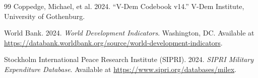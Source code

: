 \documentclass[11pt]{article}
\begin{document}
\begin{thebibliography}{99}
Coppedge, Michael, et al. 2024.
``V-Dem Codebook v14.''
V-Dem Institute, University of Gothenburg.

World Bank. 2024.
\textit{World Development Indicators}.
Washington, DC.
Available at \url{https://databank.worldbank.org/source/world-development-indicators}.

Stockholm International Peace Research Institute (SIPRI). 2024.
\textit{SIPRI Military Expenditure Database}.
Available at \url{https://www.sipri.org/databases/milex}.

\end{thebibliography}
\end{document}
